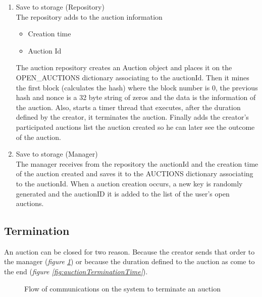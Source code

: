 \documentclass[12pt]{article}
\begin{document}
\begin{enumerate}
  \item Save to storage (Repository) \\
    The repository adds to the auction information
    \begin{itemize}
      \item Creation time
      \item Auction Id
    \end{itemize}
    The auction repository creates an Auction object and places it on the OPEN\_AUCTIONS dictionary
      associating to the auctionId. Then it mines the first block (calculates the hash) where the block number 
      is 0, the previous hash and nonce is a 32 byte string of zeros and the data is the information of the 
      auction. Also, starts a timer thread that executes, after the duration defined by the creator, it
      terminates the auction. Finally adds the creator's participated auctions list the auction
      created so he can later see the outcome of the auction.

  \item Save to storage (Manager) \\
    The manager receives from the repository the auctionId and the creation time of the auction created
      and saves it to the AUCTIONS dictionary associating to the auctionId. When a auction creation occurs, a new key is randomly generated and the auctionID it is added to the list of the user's open auctions.
    
\end{enumerate}

\subsection{Termination}
An auction can be closed for two reason. Because the creator sends that order to the manager 
  (\textit{figure \ref{fig:auctionTermination}}) or because the duration defined to the auction as come to the end 
  (\textit{figure \ref{fig:auctionTerminationTime}}).

\label{subsec:auctionTermination}

\begin{figure}[h]
  \caption{Flow of communications on the system to terminate an auction}
  \label{fig:auctionTermination}
\end{figure}
\end{document}
